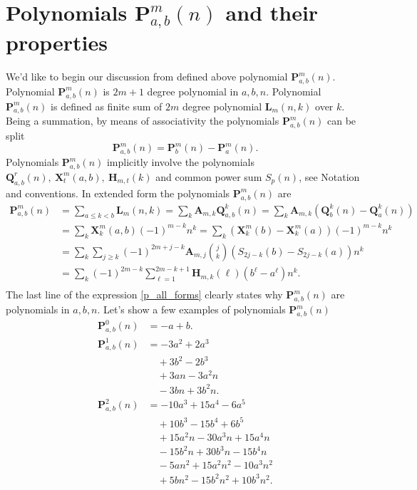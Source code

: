 \documentclass[12pt, letterpaper]{amsart}
\theoremstyle{definition}
\theoremstyle{remark}
\numberwithin{equation}{section}
\begin{document}
\section{Polynomials \texorpdfstring{$\mathbf{P}^{m}_{a,b}(n)$}{Pm[a,b](n)} and their properties}
We'd like to begin our discussion from defined above polynomial $\mathbf{P}^{m}_{a,b}(n)$. Polynomial $\mathbf{P}^{m}_{a,b}(n)$ is $2m+1$ degree polynomial in $a,b,n$. Polynomial $\mathbf{P}^{m}_{a,b}(n)$ is defined as finite sum of $2m$ degree polynomial $\mathbf{L}_m(n,k)$ over $k$. Being a summation, by means of associativity the polynomials $\mathbf{P}^{m}_{a,b}(n)$ can be split
\begin{equation*}
\mathbf{P}^{m}_{a,b}(n)=\mathbf{P}^{m}_{b}(n)-\mathbf{P}^{m}_{a}(n).
\end{equation*}
Polynomials $\mathbf{P}^{m}_{a,b}(n)$ implicitly involve the polynomials $\mathbf{Q}^{r}_{a,b}(n), \ \mathbf{X}^{m}_{t}(a,b), \ \mathbf{H}_{m,t}(k)$ and common power sum $S_p(n)$, see Notation and conventions. In extended form the polynomials $\mathbf{P}^{m}_{a,b}(n)$ are
\begin{equation}
\label{p_all_forms}
\begin{split}
\mathbf{P}^{m}_{a,b}(n)
&=\sum_{a \leq k < b}\mathbf{L}_m(n,k)
 =\sum\limits_{k}\mathbf{A}_{m,k}\mathbf{Q}^{k}_{a,b}(n)
 =\sum\limits_{k}\mathbf{A}_{m,k}(\mathbf{Q}^{k}_{b}(n)-\mathbf{Q}^{k}_{a}(n)) \\
&=\sum_{k}\mathbf{X}^{m}_{k}(a,b) (-1)^{m-k} n^k
 =\sum_{k} (\mathbf{X}^{m}_{k}(b)-\mathbf{X}^{m}_{k}(a)) (-1)^{m-k} n^k \\
&=\sum_{k} \sum\limits_{j\geq k}(-1)^{2m+j-k} \mathbf{A}_{m,j} \binom{j}{k}(S_{2j-k}(b)-S_{2j-k}(a)) n^k \\
&=\sum_{k} (-1)^{2m-k} \sum_{\ell=1}^{2m-k+1} \mathbf{H}_{m,k}(\ell)(b^\ell - a^\ell)n^k. \\
\end{split}
\end{equation}
The last line of the expression \eqref{p_all_forms} clearly states why $\mathbf{P}^{m}_{a,b}(n)$ are polynomials in $a,b,n$. Let's show a few examples of polynomials $\mathbf{P}^{m}_{a,b}(n)$
\begin{equation*}
\begin{split}
\mathbf{P}^{0}_{a,b}(n)
&=-a+b.\\
\mathbf{P}^{1}_{a,b}(n)
& =-3 a^2 + 2 a^3 \\
&\quad + 3 b^2 - 2 b^3 \\
&\quad + 3 a n - 3 a^2 n \\
&\quad - 3 b n + 3 b^2 n. \\
\mathbf{P}^{2}_{a,b}(n)
&=- 10 a^3 + 15 a^4 - 6 a^5 \\
&\quad + 10 b^3 - 15 b^4 + 6 b^5 \\
&\quad + 15 a^2 n - 30 a^3 n + 15 a^4 n \\
&\quad - 15 b^2 n + 30 b^3 n - 15 b^4 n \\
&\quad - 5 a n^2 + 15 a^2 n^2 - 10 a^3 n^2 \\
&\quad + 5 b n^2 - 15 b^2 n^2 + 10 b^3 n^2. \\
\end{split}
\end{equation*}
\end{document}
